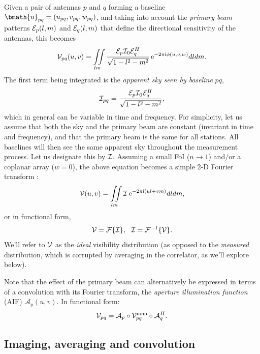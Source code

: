 \documentclass[useAMS,usenatbib]{mn2e}
\newcommand{\ee}{\mathrm{e}}
\newcommand{\ii}{\mathrm{i}}
\begin{document}
Given a pair of antennas $p$ and $q$ forming a baseline $\bmath{u}_{pq}=(u_{pq},v_{pq},w_{pq})$, 
and taking into account the \emph{primary beam} patterns $\mathcal{E}_p(l,m)$ and $\mathcal{E}_q(l,m)$ that define the directional sensitivity of 
the antennas, this becomes 
\begin{equation}
\VV_{pq}(u,v)=\iint\limits_{lm} \frac{\EE_p \II_0 \EE_q^H}{\sqrt{1-l^2 - m^2}}\,\ee^{-2\pi\ii\phi (u,v,w)}dldm. \label{eq:visSky}
\end{equation}
The first term being integrated is the \emph{apparent sky seen by baseline} $pq$,
\begin{equation}
\mathcal{I}_{pq} = \frac{\mathcal{E}_p \mathcal{I}_0 \mathcal{E}_q^H}{\sqrt{1-l^2 - m^2}},
\end{equation} 
which in general can be variable in time and frequency. 
For simplicity, let us assume that both the sky and the primary beam are constant (invariant in time and frequency), and that the primary beam is the same for all stations. All baselines will then see the same apparent sky throughout the measurement process. Let us designate this by $\mathcal{I}$. Assuming a small FoI ($n\to 1$) and/or a coplanar array ($w=0$), the above equation becomes a simple 2-D Fourier transform :
\begin{equation}
\VV(u,v)=\iint\limits_{lm} \II\,\ee^{-2\pi\ii(ul+vm)}dldm, \label{eq:visSky:2D}
\end{equation} 
or in functional form,
\begin{equation}
\mathcal{V}=\mathcal{F}\{\mathcal{I}\},~~\mathcal{I}=\mathcal{F}^{-1}\{\mathcal{V}\}.
\end{equation}
We'll refer to $\mathcal{V}$ as the \emph{ideal} visibility distribution (as opposed
to the \emph{measured} distribution, which is corrupted by averaging in the correlator, as we'll explore below).

Note that the effect of the primary beam can alternatively be expressed in terms of a convolution with its Fourier transform, the \emph{aperture 
illumination function} (AIF) $\mathcal{A}_p(u,v)$. In functional form:
\begin{equation}
\mathcal{V}_{pq} = \mathcal{A}_p \circ \mathcal{V}^\mathrm{nom}_{pq} \circ \mathcal{A}_q^H.\label{eq:visSky:conv}
\end{equation} 

\subsection{Imaging, averaging and convolution}
\end{document}
